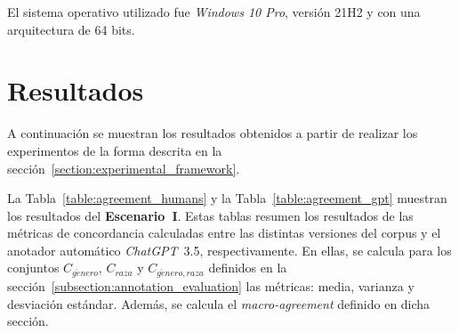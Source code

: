 El sistema operativo utilizado fue \emph{Windows 10 Pro}, versi\'on 21H2 y con una arquitectura de 64 bits.

\section{Resultados}
A continuaci\'on se muestran los resultados obtenidos a partir de realizar los experimentos de la forma descrita en la 
secci\'on~\ref{section:experimental_framework}.

La Tabla~\ref{table:agreement_humans} y la Tabla~\ref{table:agreement_gpt} muestran los resultados del \textbf{Escenario~I}.
Estas tablas resumen los resultados de las m\'etricas de concordancia calculadas entre las distintas
versiones del corpus y el anotador autom\'atico \emph{ChatGPT}~3.5, respectivamente. En ellas, se 
calcula para los conjuntos $C_{g\acute{e}nero}$, $C_{raza}$ y $C_{g\acute{e}nero, raza}$ definidos
en la secci\'on~\ref{subsection:annotation_evaluation} las m\'etricas: media, varianza y desviaci\'on
est\'andar. Adem\'as, se calcula el \emph{macro-agreement} definido en dicha secci\'on.

